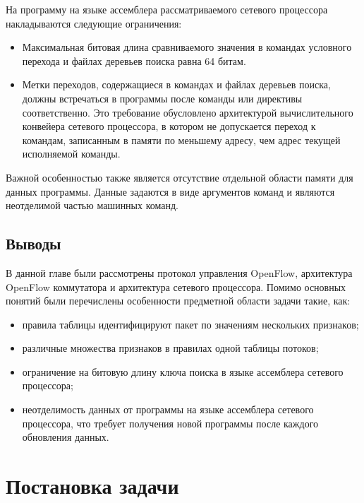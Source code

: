 \documentclass[oneside,final,12pt]{extarticle}
\begin{document}
            На программу на языке ассемблера рассматриваемого сетевого процессора накладываются 
            следующие ограничения:
            \begin{itemize}
                \item Максимальная битовая длина сравниваемого значения в командах условного перехода 
                    и файлах деревьев поиска равна 64 битам.
                \item Метки переходов, содержащиеся в командах и файлах деревьев поиска, 
                    должны встречаться в программы после команды или директивы соответственно. 
                    Это требование обусловлено архитектурой вычислительного конвейера сетевого 
                    процессора, в котором не допускается переход к командам, 
                    записанным в памяти по меньшему адресу, чем адрес текущей исполняемой команды.
            \end{itemize}

            Важной особенностью также является отсутствие отдельной области памяти для данных программы. 
            Данные задаются в виде аргументов команд и являются неотделимой частью машинных команд.
        \subsection{Выводы} 
            В данной главе были рассмотрены протокол управления OpenFlow, 
            архитектура OpenFlow коммутатора и архитектура сетевого процессора. 
            Помимо основных понятий были перечислены особенности предметной области задачи 
            такие, как:
            \begin{itemize}
                \item правила таблицы идентифицируют пакет по значениям нескольких признаков;
                \item различные множества признаков в правилах одной таблицы потоков;
                \item ограничение на битовую длину ключа поиска 
                    в языке ассемблера сетевого процессора;
                \item неотделимость данных от программы на языке ассемблера сетевого процессора, 
                    что требует получения новой программы после каждого обновления данных.
            \end{itemize}

    \section{Постановка задачи}
    \label{sect:problem}
\end{document}
